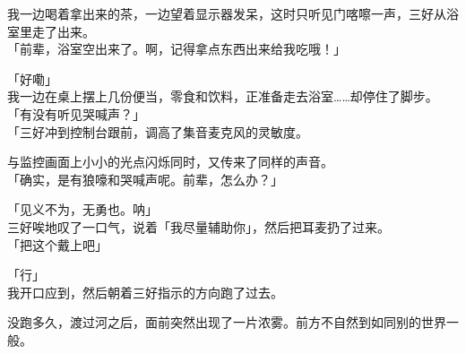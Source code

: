 我一边喝着拿出来的茶，一边望着显示器发呆，这时只听见门喀嚓一声，三好从浴室里走了出来。\\

「前辈，浴室空出来了。啊，记得拿点东西出来给我吃哦！」

「好嘞」\\

我一边在桌上摆上几份便当，零食和饮料，正准备走去浴室……却停住了脚步。\\

「有没有听见哭喊声？」\\

「三好冲到控制台跟前，调高了集音麦克风的灵敏度。

与监控画面上小小的光点闪烁同时，又传来了同样的声音。\\

「确实，是有狼嚎和哭喊声呢。前辈，怎么办？」

「见义不为，无勇也。呐」\\

三好唉地叹了一口气，说着「我尽量辅助你」，然后把耳麦扔了过来。\\

「把这个戴上吧」

「行」\\

我开口应到，然后朝着三好指示的方向跑了过去。

没跑多久，渡过河之后，面前突然出现了一片浓雾。前方不自然到如同别的世界一般。\\

